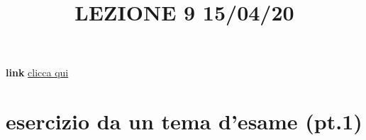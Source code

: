 \title{LEZIONE 9 15/04/20}
\textbf{link} \href{https://web.microsoftstream.com/video/50d86a59-0bba-4abf-80d2-97c0fc1f39e1?list=user&userId=cfe0965d-9a7c-40e2-be6e-f078296a1914}{clicca qui}
\section{esercizio da un tema d'esame (pt.1)}